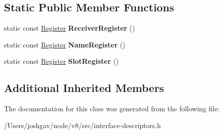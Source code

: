 \subsection*{Static Public Member Functions}
\begin{DoxyCompactItemize}
\item 
static const \hyperlink{structv8_1_1internal_1_1_register}{Register} {\bfseries Receiver\+Register} ()\hypertarget{classv8_1_1internal_1_1_load_descriptor_a34afae82eb9421420a6845c009a115b2}{}\label{classv8_1_1internal_1_1_load_descriptor_a34afae82eb9421420a6845c009a115b2}

\item 
static const \hyperlink{structv8_1_1internal_1_1_register}{Register} {\bfseries Name\+Register} ()\hypertarget{classv8_1_1internal_1_1_load_descriptor_aeb0d01b8a363310665e33511301635f2}{}\label{classv8_1_1internal_1_1_load_descriptor_aeb0d01b8a363310665e33511301635f2}

\item 
static const \hyperlink{structv8_1_1internal_1_1_register}{Register} {\bfseries Slot\+Register} ()\hypertarget{classv8_1_1internal_1_1_load_descriptor_ad42a6c6dcf42886f1a1c3e6216a0b5f2}{}\label{classv8_1_1internal_1_1_load_descriptor_ad42a6c6dcf42886f1a1c3e6216a0b5f2}

\end{DoxyCompactItemize}
\subsection*{Additional Inherited Members}


The documentation for this class was generated from the following file\+:\begin{DoxyCompactItemize}
\item 
/\+Users/joshgav/node/v8/src/interface-\/descriptors.\+h\end{DoxyCompactItemize}
